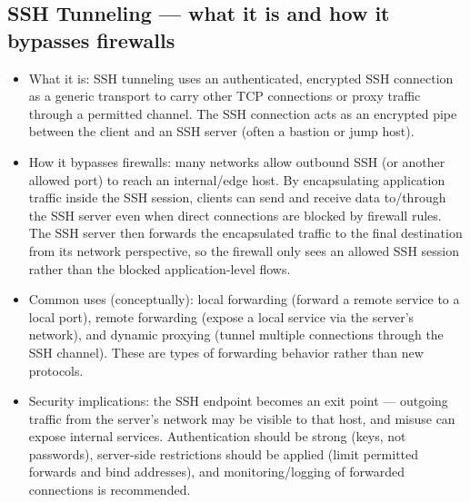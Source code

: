 \documentclass[12pt]{article}
\begin{document}
\subsection{SSH Tunneling --- what it is and how it bypasses firewalls}
\begin{itemize}
  \item What it is: SSH tunneling uses an authenticated, encrypted SSH connection as a generic transport to carry other TCP connections or proxy traffic through a permitted channel. The SSH connection acts as an encrypted pipe between the client and an SSH server (often a bastion or jump host).
  \item How it bypasses firewalls: many networks allow outbound SSH (or another allowed port) to reach an internal/edge host. By encapsulating application traffic inside the SSH session, clients can send and receive data to/through the SSH server even when direct connections are blocked by firewall rules. The SSH server then forwards the encapsulated traffic to the final destination from its network perspective, so the firewall only sees an allowed SSH session rather than the blocked application-level flows.
  \item Common uses (conceptually): local forwarding (forward a remote service to a local port), remote forwarding (expose a local service via the server's network), and dynamic proxying (tunnel multiple connections through the SSH channel). These are types of forwarding behavior rather than new protocols.
  \item Security implications: the SSH endpoint becomes an exit point --- outgoing traffic from the server's network may be visible to that host, and misuse can expose internal services. Authentication should be strong (keys, not passwords), server-side restrictions should be applied (limit permitted forwards and bind addresses), and monitoring/logging of forwarded connections is recommended.
\end{itemize}

\hrulefill
\end{document}
